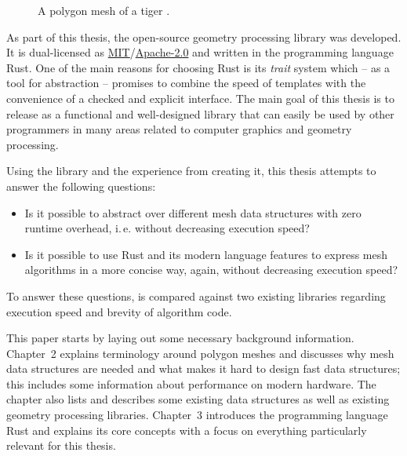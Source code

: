 \vspace{5mm}

\begin{figure}[h]
  \centering
  
  \caption{A polygon mesh of a tiger \cite{tigermodel}.}
\end{figure}

\vspace{1cm}

As part of this thesis, the open-source geometry processing library  was developed.
It is dual-licensed as \hyperlink{mit}{MIT}/\hyperlink{apache2}{Apache-2.0} and written in the programming language Rust.
One of the main reasons for choosing Rust is its \emph{trait} system which -- as a tool for abstraction -- promises to combine the speed of \cpp templates with the convenience of a checked and explicit interface.
The main goal of this thesis is to release  as a functional and well-designed library that can easily be used by other programmers in many areas related to computer graphics and geometry processing.

\newpage

Using the library  and the experience from creating it, this thesis attempts to answer the following questions:

\begin{itemize}
  \item Is it possible to abstract over different mesh data structures with zero runtime overhead, i.\,e. without decreasing execution speed?
  \item Is it possible to use Rust and its modern language features to express mesh algorithms in a more concise way, again, without decreasing execution speed?
\end{itemize}

To answer these questions,  is compared against two existing \cpp libraries regarding execution speed and brevity of algorithm code.

\vspace{1cm}

This paper starts by laying out some necessary background information.
Chapter~2 explains terminology around polygon meshes and discusses why mesh data structures are needed and what makes it hard to design fast data structures; this includes some information about performance on modern hardware.
The chapter also lists and describes some existing data structures as well as existing geometry processing libraries.
Chapter~3 introduces the programming language Rust and explains its core concepts with a focus on everything particularly relevant for this thesis.

